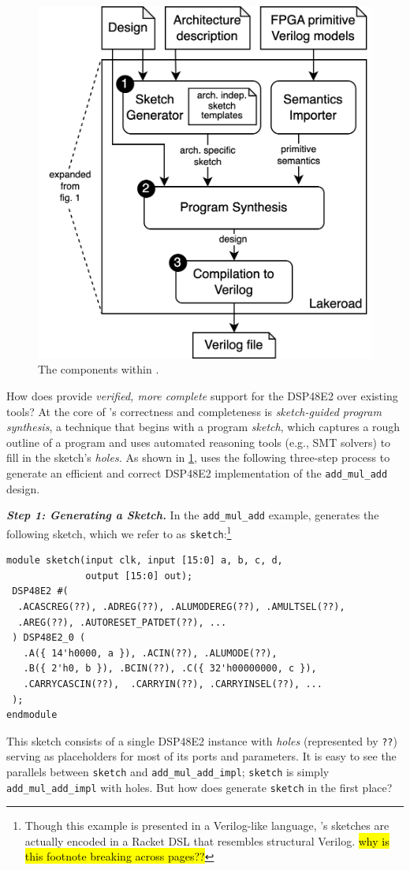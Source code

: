 \begin{figure}
    \centering
    \hspace{-1cm}%
    \includegraphics[width=.5\columnwidth]{lakeroad/assets/lakeroad-diagram.drawio.png}
   \caption{The components within \lr.}
    \label{fig:lakeroad-diagram}
\end{figure}

How does \lr provide 
  \textit{verified, more complete} support
  for the DSP48E2 over existing tools?  
At the core of \lr's
  correctness and completeness
  is
  \textit{sketch-guided program synthesis},
  a technique that  
  begins with a program \textit{sketch}, which
  captures a rough
  outline of a program
  and uses
  automated reasoning tools
  (e.g., SMT solvers)
  to fill in the sketch's \textit{holes.}
As shown in \cref{fig:lakeroad-diagram}, 
  \lr uses the following three-step process  
  to generate an efficient and correct
  DSP48E2 implementation
  of
  the \texttt{add\_mul\_add}
  design.

\textit{\textbf{Step 1: Generating a Sketch.}}
In
  the \texttt{add\_mul\_add}
  example,
  \lr
  generates
  the following sketch,
  which we refer to as \texttt{sketch}:\footnote{
Though this example is presented in a Verilog-like language,
  \lr's sketches are actually encoded in a Racket DSL that resembles structural Verilog.
  \hl{why is this footnote breaking across pages??}}
\begin{verbatim}
module sketch(input clk, input [15:0] a, b, c, d,
              output [15:0] out);
 DSP48E2 #(
  .ACASCREG(??), .ADREG(??), .ALUMODEREG(??), .AMULTSEL(??), 
  .AREG(??), .AUTORESET_PATDET(??), ...
 ) DSP48E2_0 (
   .A({ 14'h0000, a }), .ACIN(??), .ALUMODE(??), 
   .B({ 2'h0, b }), .BCIN(??), .C({ 32'h00000000, c }),
   .CARRYCASCIN(??),  .CARRYIN(??), .CARRYINSEL(??), ...
 );
endmodule
\end{verbatim}
This sketch consists of a single DSP48E2 instance
  with \textit{holes} 
  (represented by \texttt{??}) 
  serving as placeholders for most of its ports and parameters.
It is easy to see  
  the parallels
  between \texttt{sketch}
  and
  \texttt{add\_mul\_add\_impl};
  \texttt{sketch}
  is simply 
  \texttt{add\_mul\_add\_impl}
  with holes.
But how does \lr generate \texttt{sketch}
  in the first place?

